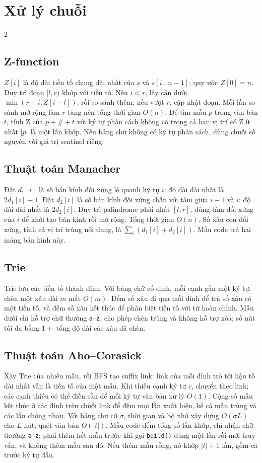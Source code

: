 \section{Xử lý chuỗi}
\begingroup\small
\begin{multicols}{2}
\subsection{Z-function}
$Z[i]$ là độ dài tiền tố chung dài nhất của $s$ và
$s[i\ldots n-1]$; quy ước $Z[0]=n$.
Duy trì đoạn $[l,r)$ khớp với tiền tố. Nếu $i<r$,
lấy cận dưới $\min(r-i,Z[i-l])$, rồi so sánh thêm;
nếu vượt $r$, cập nhật đoạn. Mỗi lần so sánh mở rộng làm
$r$ tăng nên tổng thời gian $O(n)$.
Để tìm mẫu $p$ trong văn bản $t$, tính Z của
$p+\#+t$ với ký tự phân cách không có trong cả hai;
vị trí có Z ít nhất $|p|$ là một lần khớp. Nếu bảng chữ
không có ký tự phân cách, dùng chuỗi số nguyên với
giá trị sentinel riêng.

\subsection{Thuật toán Manacher}
Đặt $d_1[i]$ là số bán kính đối xứng lẻ quanh ký tự $i$:
độ dài dài nhất là $2d_1[i]-1$.
Đặt $d_2[i]$ là số bán kính đối xứng chẵn với tâm giữa
$i-1$ và $i$: độ dài dài nhất là $2d_2[i]$.
Duy trì palindrome phải nhất $[l,r]$, dùng tâm đối xứng
của $i$ để khởi tạo bán kính rồi mở rộng. Tổng thời gian
$O(n)$. Số xâu con đối xứng, tính cả vị trí trùng nội dung,
là $\sum_i(d_1[i]+d_2[i])$.
Mẫu code trả hai mảng bán kính này.

\subsection{Trie}
Trie lưu các tiền tố thành đỉnh. Với bảng chữ cố định,
mỗi cạnh gắn một ký tự; chèn một xâu dài $m$ mất $O(m)$.
Đếm số xâu đi qua mỗi đỉnh để trả số xâu có một tiền tố,
và đếm số xâu kết thúc để phân biệt tiền tố với từ hoàn chỉnh.
Mẫu dưới chỉ hỗ trợ chữ thường \texttt{a}--\texttt{z},
cho phép chèn trùng và không hỗ trợ xóa; số nút tối đa bằng
$1+$ tổng độ dài các xâu đã chèn.

\subsection{Thuật toán Aho--Corasick}
Xây Trie của nhiều mẫu, rồi BFS tạo suffix link: link của
mỗi đỉnh trỏ tới hậu tố dài nhất vẫn là tiền tố của một mẫu.
Khi thiếu cạnh ký tự $c$, chuyển theo link; các cạnh thiếu
có thể điền sẵn để mỗi ký tự văn bản xử lý $O(1)$.
Cộng số mẫu kết thúc ở các đỉnh trên chuỗi link để đếm mọi
lần xuất hiện, kể cả mẫu trùng và các lần chồng nhau.
Với bảng chữ cỡ $\sigma$, thời gian và bộ nhớ xây dựng
$O(\sigma L)$ cho $L$ nút; quét văn bản $O(|t|)$.
Mẫu code đếm tổng số lần khớp, chỉ nhận chữ thường
\texttt{a}--\texttt{z}; phải thêm hết mẫu trước khi gọi
\texttt{build()} đúng một lần rồi mới truy vấn, và không thêm mẫu sau đó.
Nếu thêm mẫu rỗng, nó khớp $|t|+1$ lần, gồm cả trước ký tự đầu.


\end{multicols}
